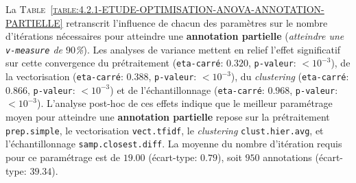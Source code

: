 			La \textsc{Table~\ref{table:4.2.1-ETUDE-OPTIMISATION-ANOVA-ANNOTATION-PARTIELLE}} retranscrit l'influence de chacun des paramètres sur le nombre d'itérations nécessaires pour atteindre une \textbf{annotation partielle} (\textit{atteindre une \texttt{v-measure} de $90$\%}).
			Les analyses de variance mettent en relief l'effet significatif sur cette convergence du prétraitement (\texttt{eta-carré}: $0.320$, \texttt{p-valeur}: $< 10^{-3}$), de la vectorisation (\texttt{eta-carré}: $0.388$, \texttt{p-valeur}: $< 10^{-3}$), du \textit{clustering} (\texttt{eta-carré}: $0.866$, \texttt{p-valeur}: $< 10^{-3}$) et de l'échantillonnage (\texttt{eta-carré}: $0.968$, \texttt{p-valeur}: $< 10^{-3}$).
			L'analyse post-hoc de ces effets indique que le meilleur paramétrage moyen pour atteindre une \textbf{annotation partielle} repose sur la prétraitement \texttt{prep.simple}, le vectorisation \texttt{vect.tfidf}, le \textit{clustering} \texttt{clust.hier.avg}, et l'échantillonnage \texttt{samp.closest.diff}. La moyenne du nombre d'itération requis pour ce paramétrage est de $19.00$ (écart-type: $0.79$), soit $950$ annotations (écart-type: $39.34$).
